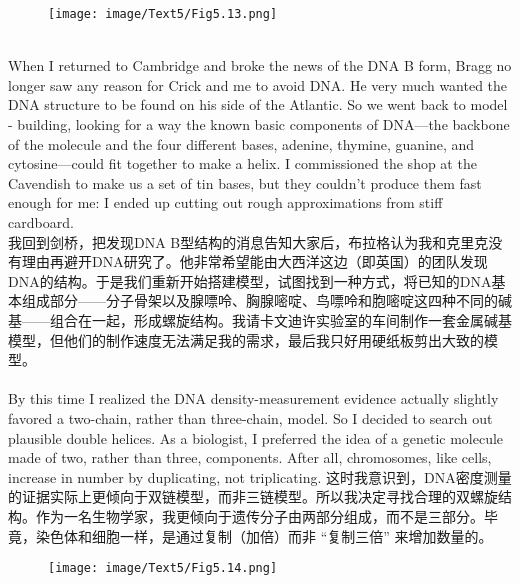 \documentclass{article}
\begin{document}
\begin{figure}
    \centering
    \texttt{[image: image/Text5/Fig5.13.png]}
\end{figure}

\\
When I returned to Cambridge and broke the news of the DNA B form, Bragg no longer saw any reason for Crick and me to avoid DNA. He very much wanted the DNA structure to be found on his side of the Atlantic. So we went back to model - building, looking for a way the known basic components of DNA—the backbone of the molecule and the four different bases, adenine, thymine, guanine, and cytosine—could fit together to make a helix. I commissioned the shop at the Cavendish to make us a set of tin bases, but they couldn’t produce them fast enough for me: I ended up cutting out rough approximations from stiff cardboard.\\
我回到剑桥，把发现DNA B型结构的消息告知大家后，布拉格认为我和克里克没有理由再避开DNA研究了。他非常希望能由大西洋这边（即英国）的团队发现DNA的结构。于是我们重新开始搭建模型，试图找到一种方式，将已知的DNA基本组成部分——分子骨架以及腺嘌呤、胸腺嘧啶、鸟嘌呤和胞嘧啶这四种不同的碱基——组合在一起，形成螺旋结构。我请卡文迪许实验室的车间制作一套金属碱基模型，但他们的制作速度无法满足我的需求，最后我只好用硬纸板剪出大致的模型。\\

\\
By this time I realized the DNA density-measurement evidence actually slightly favored a two-chain, rather than three-chain, model. So I decided to search out plausible double helices. As a biologist, I preferred the idea of a genetic molecule made of two, rather than three, components. After all, chromosomes, like cells, increase in number by duplicating, not triplicating.
这时我意识到，DNA密度测量的证据实际上更倾向于双链模型，而非三链模型。所以我决定寻找合理的双螺旋结构。作为一名生物学家，我更倾向于遗传分子由两部分组成，而不是三部分。毕竟，染色体和细胞一样，是通过复制（加倍）而非 “复制三倍” 来增加数量的。\\

\begin{figure}
    \centering
    \texttt{[image: image/Text5/Fig5.14.png]}
\end{figure}
\end{document}
